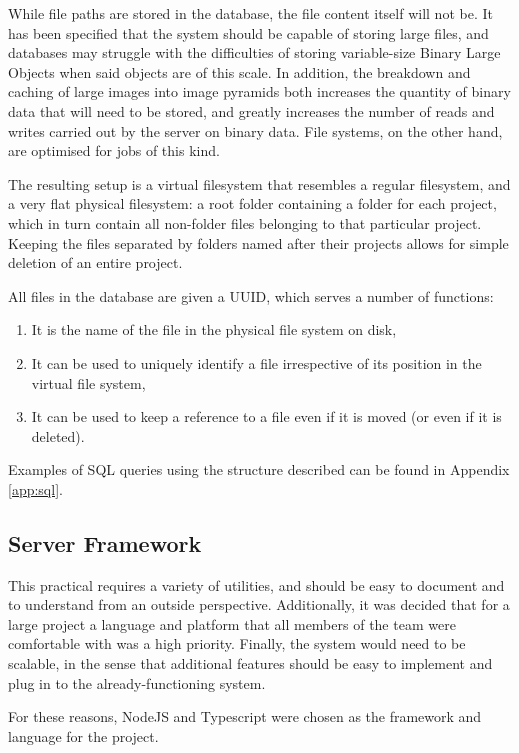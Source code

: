 \documentclass{article}
\begin{document}
While file paths are stored in the database, the file content itself will not be.
It has been specified that the system should be capable of storing large files,
and databases may struggle with the difficulties of storing variable-size Binary
Large Objects when said objects are of this scale. In addition, the breakdown and
caching of large images into image pyramids both increases the quantity of binary
data that will need to be stored, and greatly increases the number of reads and
writes carried out by the server on binary data. File systems, on the other hand,
are optimised for jobs of this kind.

The resulting setup is a virtual filesystem that resembles a regular filesystem,
and a very flat physical filesystem: a root folder containing a folder for each
project, which in turn contain all non-folder files belonging to that particular project.
Keeping the files separated by folders named after their projects allows for simple
deletion of an entire project.

All files in the database are given a UUID, which serves a number of functions:
\begin{enumerate}
    \item It is the name of the file in the physical file system on disk,
    \item It can be used to uniquely identify a file irrespective of its position
        in the virtual file system,
    \item It can be used to keep a reference to a file even if it is moved
        (or even if it is deleted).
\end{enumerate}

Examples of SQL queries using the structure described can be found in Appendix
\ref{app:sql}.

\subsection{Server Framework}
This practical requires a variety of utilities, and should be easy to document and
to understand from an outside perspective. Additionally, it was decided that for a
large project a language and platform that all members of the team were comfortable
with was a high priority. Finally, the system would need to be scalable, in the sense
that additional features should be easy to implement and plug in to the
already-functioning system.

For these reasons, NodeJS and Typescript were chosen as the framework and language
for the project.
\end{document}
